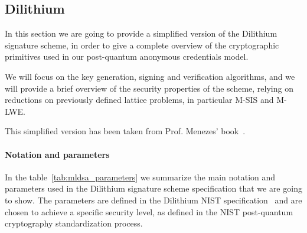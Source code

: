 \documentclass[binding=0.6cm,oneside,noexaminfo]{sapthesis}
\begin{document}
\subsection{Dilithium}
\label{dilithium}
In this section we are going to provide a simplified version of the Dilithium signature scheme,
in order to give a complete overview of the cryptographic primitives used in our post-quantum anonymous credentials model.

We will focus on the key generation, signing and verification algorithms, and we will provide a brief overview of the security properties of the scheme,
relying on reductions on previously defined lattice problems, in particular M-SIS and M-LWE.

This simplified version has been taken from Prof. Menezes' book~\cite{Menezes1996Handbook}.

\paragraph{Notation and parameters} In the table~\ref{tab:mldsa_parameters} we summarize the main notation and parameters used in the Dilithium signature scheme specification
that we are going to show. The parameters are defined in the Dilithium NIST specification~\cite{NIST2024FIPS204} and are chosen to achieve a specific security level, as defined in the NIST post-quantum cryptography standardization process.
\end{document}
